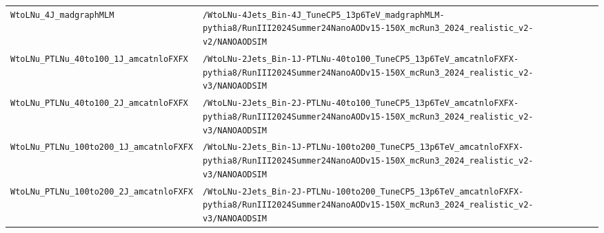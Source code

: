 \begin{longtable}{@{}>{\RaggedRight\arraybackslash}p{} >{\RaggedRight\arraybackslash}p{}@{}}
\addlinespace[2pt]
\texttt{WtoLNu\_\allowbreak{}4J\_\allowbreak{}madgraphMLM} & \texttt{/\allowbreak{}WtoLNu-\allowbreak{}4Jets\_\allowbreak{}Bin-\allowbreak{}4J\_\allowbreak{}TuneCP5\_\allowbreak{}13p6TeV\_\allowbreak{}madgraphMLM-\allowbreak{}pythia8/\allowbreak{}RunIII2024Summer24NanoAODv15-\allowbreak{}150X\_\allowbreak{}mcRun3\_\allowbreak{}2024\_\allowbreak{}realistic\_\allowbreak{}v2-\allowbreak{}v2/\allowbreak{}NANOAODSIM} \\
\addlinespace[2pt]
\texttt{WtoLNu\_\allowbreak{}PTLNu\_\allowbreak{}40to100\_\allowbreak{}1J\_\allowbreak{}amcatnloFXFX} & \texttt{/\allowbreak{}WtoLNu-\allowbreak{}2Jets\_\allowbreak{}Bin-\allowbreak{}1J-\allowbreak{}PTLNu-\allowbreak{}40to100\_\allowbreak{}TuneCP5\_\allowbreak{}13p6TeV\_\allowbreak{}amcatnloFXFX-\allowbreak{}pythia8/\allowbreak{}RunIII2024Summer24NanoAODv15-\allowbreak{}150X\_\allowbreak{}mcRun3\_\allowbreak{}2024\_\allowbreak{}realistic\_\allowbreak{}v2-\allowbreak{}v3/\allowbreak{}NANOAODSIM} \\
\addlinespace[2pt]
\texttt{WtoLNu\_\allowbreak{}PTLNu\_\allowbreak{}40to100\_\allowbreak{}2J\_\allowbreak{}amcatnloFXFX} & \texttt{/\allowbreak{}WtoLNu-\allowbreak{}2Jets\_\allowbreak{}Bin-\allowbreak{}2J-\allowbreak{}PTLNu-\allowbreak{}40to100\_\allowbreak{}TuneCP5\_\allowbreak{}13p6TeV\_\allowbreak{}amcatnloFXFX-\allowbreak{}pythia8/\allowbreak{}RunIII2024Summer24NanoAODv15-\allowbreak{}150X\_\allowbreak{}mcRun3\_\allowbreak{}2024\_\allowbreak{}realistic\_\allowbreak{}v2-\allowbreak{}v3/\allowbreak{}NANOAODSIM} \\
\addlinespace[2pt]
\texttt{WtoLNu\_\allowbreak{}PTLNu\_\allowbreak{}100to200\_\allowbreak{}1J\_\allowbreak{}amcatnloFXFX} & \texttt{/\allowbreak{}WtoLNu-\allowbreak{}2Jets\_\allowbreak{}Bin-\allowbreak{}1J-\allowbreak{}PTLNu-\allowbreak{}100to200\_\allowbreak{}TuneCP5\_\allowbreak{}13p6TeV\_\allowbreak{}amcatnloFXFX-\allowbreak{}pythia8/\allowbreak{}RunIII2024Summer24NanoAODv15-\allowbreak{}150X\_\allowbreak{}mcRun3\_\allowbreak{}2024\_\allowbreak{}realistic\_\allowbreak{}v2-\allowbreak{}v3/\allowbreak{}NANOAODSIM} \\
\addlinespace[2pt]
\texttt{WtoLNu\_\allowbreak{}PTLNu\_\allowbreak{}100to200\_\allowbreak{}2J\_\allowbreak{}amcatnloFXFX} & \texttt{/\allowbreak{}WtoLNu-\allowbreak{}2Jets\_\allowbreak{}Bin-\allowbreak{}2J-\allowbreak{}PTLNu-\allowbreak{}100to200\_\allowbreak{}TuneCP5\_\allowbreak{}13p6TeV\_\allowbreak{}amcatnloFXFX-\allowbreak{}pythia8/\allowbreak{}RunIII2024Summer24NanoAODv15-\allowbreak{}150X\_\allowbreak{}mcRun3\_\allowbreak{}2024\_\allowbreak{}realistic\_\allowbreak{}v2-\allowbreak{}v3/\allowbreak{}NANOAODSIM} \\

\end{longtable}
